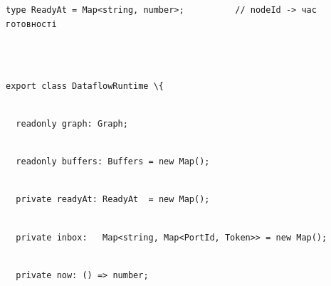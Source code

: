 \documentclass[
]{article}
\newcommand{\passthrough}[1]{#1}
\begin{document}
\passthrough{\lstinline!type!}\passthrough{\lstinline! !}\passthrough{\lstinline!ReadyAt!}\passthrough{\lstinline! !}\passthrough{\lstinline!=!}\passthrough{\lstinline! !}\passthrough{\lstinline!Map<string,!}\passthrough{\lstinline! !}\passthrough{\lstinline!number>;!}\passthrough{\lstinline!          !}\passthrough{\lstinline!//!}\passthrough{\lstinline! !}\passthrough{\lstinline!nodeId!}\passthrough{\lstinline! !}\passthrough{\lstinline!->!}\passthrough{\lstinline! !}\passthrough{\lstinline!час!}\passthrough{\lstinline! !}\passthrough{\lstinline!готовності!}\strut \\
\strut \\
\passthrough{\lstinline!export!}\passthrough{\lstinline! !}\passthrough{\lstinline!class!}\passthrough{\lstinline! !}\passthrough{\lstinline!DataflowRuntime!}\passthrough{\lstinline! !}\passthrough{\lstinline!\{!}\strut \\
\passthrough{\lstinline!  !}\passthrough{\lstinline!readonly!}\passthrough{\lstinline! !}\passthrough{\lstinline!graph:!}\passthrough{\lstinline! !}\passthrough{\lstinline!Graph;!}\strut \\
\passthrough{\lstinline!  !}\passthrough{\lstinline!readonly!}\passthrough{\lstinline! !}\passthrough{\lstinline!buffers:!}\passthrough{\lstinline! !}\passthrough{\lstinline!Buffers!}\passthrough{\lstinline! !}\passthrough{\lstinline!=!}\passthrough{\lstinline! !}\passthrough{\lstinline!new!}\passthrough{\lstinline! !}\passthrough{\lstinline!Map();!}\strut \\
\passthrough{\lstinline!  !}\passthrough{\lstinline!private!}\passthrough{\lstinline! !}\passthrough{\lstinline!readyAt!}\passthrough{\lstinline!:!}\passthrough{\lstinline! !}\passthrough{\lstinline!ReadyAt!}\passthrough{\lstinline!  !}\passthrough{\lstinline!=!}\passthrough{\lstinline! !}\passthrough{\lstinline!new!}\passthrough{\lstinline! !}\passthrough{\lstinline!Map();!}\strut \\
\passthrough{\lstinline!  !}\passthrough{\lstinline!private!}\passthrough{\lstinline! !}\passthrough{\lstinline!inbox:!}\passthrough{\lstinline!   !}\passthrough{\lstinline!Map<string,!}\passthrough{\lstinline! !}\passthrough{\lstinline!Map<!}\passthrough{\lstinline!PortId!}\passthrough{\lstinline!,!}\passthrough{\lstinline! !}\passthrough{\lstinline!Token>>!}\passthrough{\lstinline! !}\passthrough{\lstinline!=!}\passthrough{\lstinline! !}\passthrough{\lstinline!new!}\passthrough{\lstinline! !}\passthrough{\lstinline!Map();!}\strut \\
\passthrough{\lstinline!  !}\passthrough{\lstinline!private!}\passthrough{\lstinline! !}\passthrough{\lstinline!now:!}\passthrough{\lstinline! !}\passthrough{\lstinline!()!}\passthrough{\lstinline! !}\passthrough{\lstinline!=>!}\passthrough{\lstinline! !}\passthrough{\lstinline!number;!}\strut \\
\end{document}
